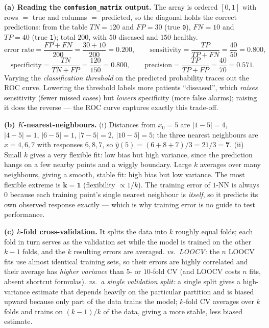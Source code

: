 \documentclass[11pt,a4paper]{article}
\begin{document}
\ifdefined\withsolutions
\begin{solutionbox}
\textbf{(a) Reading the \texttt{confusion\_matrix} output.}
The array is ordered $[0,1]$ with rows $=$ true and columns $=$ predicted, so the diagonal holds
the correct predictions: from the table $TN=120$ and $FP=30$ (true \texttt{0}), $FN=10$ and
$TP=40$ (true \texttt{1}); total $200$, with $50$ diseased and $150$ healthy.
\[
  \text{error rate}=\frac{FP+FN}{200}=\frac{30+10}{200}=\mathbf{0.200},\qquad
  \text{sensitivity}=\frac{TP}{TP+FN}=\frac{40}{50}=\mathbf{0.800},
\]
\[
  \text{specificity}=\frac{TN}{TN+FP}=\frac{120}{150}=\mathbf{0.800},\qquad
  \text{precision}=\frac{TP}{TP+FP}=\frac{40}{70}=\mathbf{0.571}.
\]
Varying the \emph{classification threshold} on the predicted probability traces out the ROC
curve. Lowering the threshold labels more patients ``diseased'', which \emph{raises}
sensitivity (fewer missed cases) but \emph{lowers} specificity (more false alarms); raising it
does the reverse --- the ROC curve captures exactly this trade-off.

\medskip
\textbf{(b) $K$-nearest-neighbours.}
(i) Distances from $x_0=5$ are $|1-5|=4$, $|4-5|=1$, $|6-5|=1$, $|7-5|=2$, $|10-5|=5$; the three
nearest neighbours are $x=4,6,7$ with responses $6,8,7$, so
$\hat{y}(5)=(6+8+7)/3=21/3=\mathbf{7}$.
(ii) Small $k$ gives a very flexible fit: low bias but high variance, since the prediction hangs
on a few nearby points and a wiggly boundary. Large $k$ averages over many neighbours, giving a
smooth, stable fit: high bias but low variance. The most flexible extreme is $\mathbf{k=1}$
(flexibility $\propto 1/k$). The training error of $1$-NN is always $0$ because each training
point's single nearest neighbour is \emph{itself}, so it predicts its own observed response
exactly --- which is why training error is no guide to test performance.

\medskip
\textbf{(c) $k$-fold cross-validation.}
It splits the data into $k$ roughly equal folds; each fold in turn serves as the validation set
while the model is trained on the other $k-1$ folds, and the $k$ resulting errors are averaged.
\emph{vs.\ LOOCV:} the $n$ LOOCV fits use almost identical training sets, so their errors are
highly correlated and their average has \emph{higher variance} than $5$- or $10$-fold CV (and
LOOCV costs $n$ fits, absent shortcut formulas).
\emph{vs.\ a single validation split:} a single split gives a high-variance estimate that
depends heavily on the particular partition and is biased upward because only part of the data
trains the model; $k$-fold CV averages over $k$ folds and trains on $(k-1)/k$ of the data,
giving a more stable, less biased estimate.


\end{solutionbox}
\end{document}
